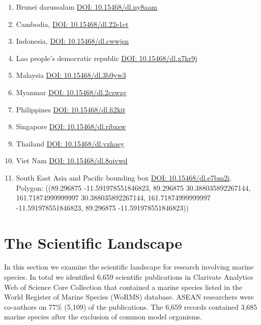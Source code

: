 \documentclass[]{book}
\providecommand{\tightlist}{%
  \setlength{\itemsep}{0pt}\setlength{\parskip}{0pt}}
\theoremstyle{definition}
\theoremstyle{definition}
\theoremstyle{definition}
\theoremstyle{remark}
\begin{document}
\begin{enumerate}
\def\labelenumi{\arabic{enumi}.}
\tightlist
\item
  Brunei darussalam
  \href{https://www.gbif.org/occurrence/download/0020859-180131172636756}{DOI:
  10.15468/dl.ny8aam}
\item
  Cambodia,
  \href{https://www.gbif.org/occurrence/download/0020860-180131172636756}{DOI:
  10.15468/dl.22e1ct}
\item
  Indonesia,
  \href{https://www.gbif.org/occurrence/download/0020862-180131172636756}{DOI:
  10.15468/dl.cwwjsn}
\item
  Lao people's democratic republic
  \href{https://www.gbif.org/occurrence/download/0020864-180131172636756}{DOI:
  10.15468/dl.x7kr9j}
\item
  Malaysia
  \href{https://www.gbif.org/occurrence/download/0020868-180131172636756}{DOI:
  10.15468/dl.3b9yw3}
\item
  Myanmar
  \href{https://www.gbif.org/occurrence/download/0020878-180131172636756}{DOI:
  10.15468/dl.2czwzg}
\item
  Philippines
  \href{https://www.gbif.org/occurrence/download/0020868-180131172636756}{DOI:
  10.15468/dl.fi2kit}
\item
  Singapore
  \href{https://www.gbif.org/occurrence/download/0020880-180131172636756}{DOI:
  10.15468/dl.ribxsw}
\item
  Thailand
  \href{https://www.gbif.org/occurrence/download/0020885-180131172636756}{DOI:
  10.15468/dl.vzhaey}
\item
  Viet Nam
  \href{https://www.gbif.org/occurrence/download/0020888-180131172636756}{DOI:
  10.15468/dl.8qivwd}
\item
  South East Asia and Pacific bounding box
  \href{https://www.gbif.org/occurrence/download/0000637-171219132708484}{DOI:
  10.15468/dl.e7bm2i}. Polygon: ((89.296875 -11.591978551846823,
  89.296875 30.388035892267144, 161.71874999999997 30.388035892267144,
  161.71874999999997 -11.591978551846823, 89.296875
  -11.591978551846823))
\end{enumerate}

\hypertarget{scientific}{%
\chapter{The Scientific Landscape}\label{scientific}}

In this section we examine the scientific landscape for research
involving marine species. In total we identified 6,659 scientific
publications in Clarivate Analytics Web of Science Core Collection that
contained a marine species listed in the World Register of Marine
Species (WoRMS) database. ASEAN researchers were co-authors on 77\%
(5,109) of the publications. The 6,659 records contained 3,685 marine
species after the exclusion of common model organisms.
\end{document}
